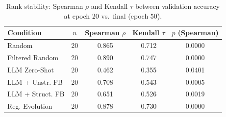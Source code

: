 \begin{table}[t]
\centering\small
\caption{Rank stability: Spearman $\rho$ and Kendall $\tau$ between validation accuracy at epoch 20 vs.\ final (epoch 50).}
\label{tab:rank}
\begin{tabular}{@{}l cccc@{}}
\toprule
Condition & $n$ & Spearman $\rho$ & Kendall $\tau$ & $p$ (Spearman) \\
\midrule
Random & 20 & 0.865 & 0.712 & 0.0000 \\
Filtered Random & 20 & 0.890 & 0.747 & 0.0000 \\
LLM Zero-Shot & 20 & 0.462 & 0.355 & 0.0401 \\
LLM + Unstr. FB & 20 & 0.708 & 0.543 & 0.0005 \\
LLM + Struct. FB & 20 & 0.651 & 0.526 & 0.0019 \\
Reg. Evolution & 20 & 0.878 & 0.730 & 0.0000 \\
\bottomrule
\end{tabular}
\end{table}